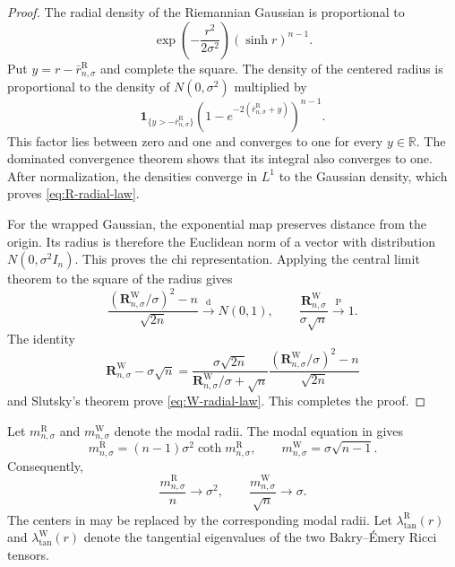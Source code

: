 \documentclass{amsart}
\numberwithin{equation}{section}
\theoremstyle{plain}
\theoremstyle{definition}
\theoremstyle{remark}
\newcommand{\R}{\mathbb{R}}
\begin{document}
\begin{proof}
	The radial density of the Riemannian Gaussian is proportional to
	\[
		\exp\left(-\frac{r^2}{2\sigma^2}\right)(\sinh r)^{n-1}.
	\]
	Put $y=r-\bar r^{\mathrm R}_{n,\sigma}$ and complete the square.  The
	density of the centered radius is proportional to the density of
	$N(0,\sigma^2)$ multiplied by
	\[
		\boldsymbol{1}_{\{y>-\bar r^{\mathrm R}_{n,\sigma}\}}
		\left(1-e^{-2(\bar r^{\mathrm R}_{n,\sigma}+y)}\right)^{n-1}.
	\]
	This factor lies between zero and one and converges to one for every
	$y\in\R$.  The dominated convergence theorem shows that its integral
	also converges to one.  After normalization, the densities converge in
	$L^1$ to the Gaussian density, which proves
	\eqref{eq:R-radial-law}.

	For the wrapped Gaussian, the exponential map preserves distance from
	the origin.  Its radius is therefore the Euclidean norm of a vector with
	distribution $N(0,\sigma^2I_n)$.  This proves the chi representation.
	Applying the central limit theorem to the square of the radius gives
	\[
		\frac{(\mathbf R^{\mathrm W}_{n,\sigma}/\sigma)^2-n}{\sqrt{2n}}
		\overset{\mathrm d}{\longrightarrow}N(0,1),
		\qquad
		\frac{\mathbf R^{\mathrm W}_{n,\sigma}}{\sigma\sqrt n}
		\overset{\mathrm P}{\longrightarrow}1.
	\]
	The identity
	\[
		\mathbf R^{\mathrm W}_{n,\sigma}-\sigma\sqrt n
		=
		\frac{\sigma\sqrt{2n}}
		{\mathbf R^{\mathrm W}_{n,\sigma}/\sigma+\sqrt n}
		\frac{(\mathbf R^{\mathrm W}_{n,\sigma}/\sigma)^2-n}{\sqrt{2n}}
	\]
	and Slutsky's theorem prove \eqref{eq:W-radial-law}.
	This completes the proof.
\end{proof}

Let $m^{\mathrm R}_{n,\sigma}$ and $m^{\mathrm W}_{n,\sigma}$ denote the
modal radii.  The modal equation in  gives
\begin{equation}\label{eq:gaussian-modes}
	m^{\mathrm R}_{n,\sigma}
	=
	(n-1)\sigma^2\coth m^{\mathrm R}_{n,\sigma},
	\qquad
	m^{\mathrm W}_{n,\sigma}
	=
	\sigma\sqrt{n-1}.
\end{equation}
Consequently,
\begin{equation}\label{eq:mode-scales}
	\frac{m^{\mathrm R}_{n,\sigma}}n\longrightarrow\sigma^2,
	\qquad
	\frac{m^{\mathrm W}_{n,\sigma}}{\sqrt n}\longrightarrow\sigma.
\end{equation}
The centers in  may be replaced by the
corresponding modal radii.  Let
$\lambda^{\mathrm R}_{\mathrm{tan}}(r)$ and
$\lambda^{\mathrm W}_{\mathrm{tan}}(r)$ denote the tangential eigenvalues of
the two Bakry--\'Emery Ricci tensors.
\end{document}
